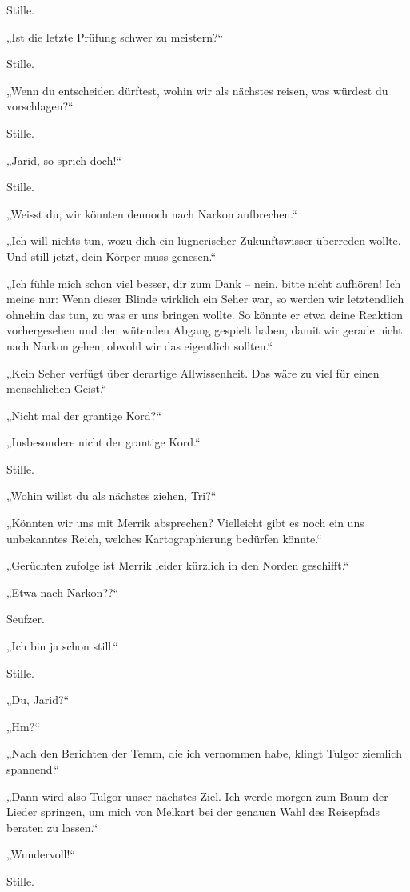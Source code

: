 \documentclass[10pt, a4paper, oneside]{book}
\begin{document}
Stille.

„Ist die letzte Prüfung schwer zu meistern?“

Stille.

„Wenn du entscheiden dürftest, wohin wir als nächstes reisen, was würdest du vorschlagen?“

Stille.

„Jarid, so sprich doch!“

Stille.

„Weisst du, wir könnten dennoch nach Narkon aufbrechen.“

„Ich will nichts tun, wozu dich ein lügnerischer Zukunftswisser überreden wollte. Und still jetzt, dein Körper muss genesen.“

„Ich fühle mich schon viel besser, dir zum Dank – nein, bitte nicht aufhören! Ich meine nur: Wenn dieser Blinde wirklich ein Seher war, so werden wir letztendlich ohnehin das tun, zu was er uns bringen wollte. So könnte er etwa deine Reaktion vorhergesehen und den wütenden Abgang gespielt haben, damit wir gerade nicht nach Narkon gehen, obwohl wir das eigentlich sollten.“

„Kein Seher verfügt über derartige Allwissenheit. Das wäre zu viel für einen menschlichen Geist.“

„Nicht mal der grantige Kord?“

„Insbesondere nicht der grantige Kord.“

Stille.

„Wohin willst du als nächstes ziehen, Tri?“

„Könnten wir uns mit Merrik absprechen? Vielleicht gibt es noch ein uns unbekanntes Reich, welches Kartographierung bedürfen könnte.“

„Gerüchten zufolge ist Merrik leider kürzlich in den Norden geschifft.“

„Etwa nach Narkon??“

Seufzer.

„Ich bin ja schon still.“

Stille.

„Du, Jarid?“

„Hm?“

„Nach den Berichten der Temm, die ich vernommen habe, klingt Tulgor ziemlich spannend.“

„Dann wird also Tulgor unser nächstes Ziel. Ich werde morgen zum Baum der Lieder springen, um mich von Melkart bei der genauen Wahl des Reisepfads beraten zu lassen.“

„Wundervoll!“

Stille.
\end{document}
